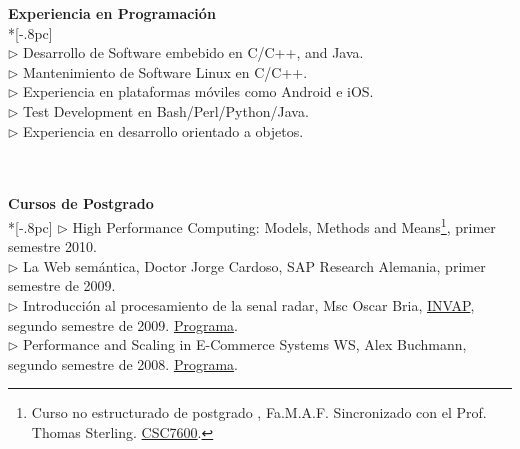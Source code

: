 \documentclass[a4paper,11pt,english]{article}
\begin{document}
{
{\large \bf Experiencia en Programaci\'on} \\*[-.8pc]
\underline{\hspace{6in}} \\
$\triangleright$ Desarrollo de Software embebido en C/C++, and Java.\\
$\triangleright$ Mantenimiento de Software Linux en C/C++.\\
$\triangleright$ Experiencia en plataformas m\'oviles como Android e iOS.\\
$\triangleright$ Test Development en Bash/Perl/Python/Java.\\
$\triangleright$ Experiencia en desarrollo orientado a objetos.\\
\\
}

 \\
{\large \bf Cursos de Postgrado}\\ *[-.8pc]
\underline{\hspace{6in}} 
$\triangleright$ High Performance Computing: Models, Methods and Means\footnote{Curso no estructurado de postgrado
, Fa.M.A.F. Sincronizado con el Prof. Thomas Sterling.
\href{http://www.cct.lsu.edu/csc7600/Home.html}{CSC7600}.}, primer semestre 2010.\\
$\triangleright$ La Web sem\'antica, Doctor Jorge Cardoso, SAP Research Alemania, primer semestre de 2009.\\
$\triangleright$ Introducci\'on al procesamiento de la senal radar, Msc Oscar Bria, 
\href{http://www.invap.net/index-e.php}{INVAP}, segundo semestre de 2009. \href{http://postgrado.info.unlp.edu.ar/Carrera/Programas/Contenidos_IPSR.pdf}{Programa}.\\
$\triangleright$ Performance and Scaling in E-Commerce Systems WS, Alex Buchmann, segundo semestre de 2008. 
\href{http://www.dvs.tu-darmstadt.de/teaching/perf/2008/}{Programa}.\\
\end{document}
